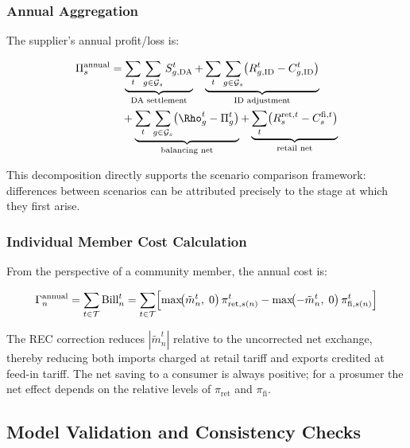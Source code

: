 \documentclass[12pt,a4paper]{article}
\begin{document}
\subsubsection{Annual Aggregation}

The supplier's annual profit/loss is:

\begin{align}
\Pi_{s}^{\mathrm{annual}}
  &= \underbrace{\sum_{t}\sum_{g \in \mathcal{G}_{s}}S_{g,\mathrm{DA}}^{t}}_{\text{DA settlement}}
   + \underbrace{\sum_{t}\sum_{g \in \mathcal{G}_{s}}
     \bigl(R_{g,\mathrm{ID}}^{t} - C_{g,\mathrm{ID}}^{t}\bigr)}_{\text{ID adjustment}}
\notag\\
  &\quad
   + \underbrace{\sum_{t}\sum_{g \in \mathcal{G}_{s}}
     \bigl(\Rho_{g}^{t} - \Pi_{g}^{t}\bigr)}_{\text{balancing net}}
   + \underbrace{\sum_{t}
     \bigl(R_{s}^{\mathrm{ret},t} - C_{s}^{\mathrm{fi},t}\bigr)}_{\text{retail net}}
\label{eq:pl_decomposed}
\end{align}

This decomposition directly supports the scenario comparison framework:
differences between scenarios can be attributed precisely to the stage at which
they first arise.

\subsubsection{Individual Member Cost Calculation}

From the perspective of a community member, the annual cost is:

\begin{equation}
\Gamma_{n}^{\mathrm{annual}}
  = \sum_{t \in \mathcal{T}} \text{Bill}_{n}^{t}
  = \sum_{t \in \mathcal{T}}
    \Bigl[
      \max\!\bigl(\tilde{m}_{n}^{t},\;0\bigr)\,\pi_{\mathrm{ret},s(n)}^{t}
    - \max\!\bigl(-\tilde{m}_{n}^{t},\;0\bigr)\,\pi_{\mathrm{fi},s(n)}^{t}
    \Bigr]
\label{eq:member_annual_cost}
\end{equation}

The REC correction reduces $|\tilde{m}_{n}^{t}|$ relative to the uncorrected
net exchange, thereby reducing both imports charged at retail tariff and
exports credited at feed-in tariff.  The net saving to a consumer is always
positive; for a prosumer the net effect depends on the relative levels of
$\pi_{\mathrm{ret}}$ and $\pi_{\mathrm{fi}}$.

\subsection{Model Validation and Consistency Checks}
\label{subsec:validation}
\end{document}
